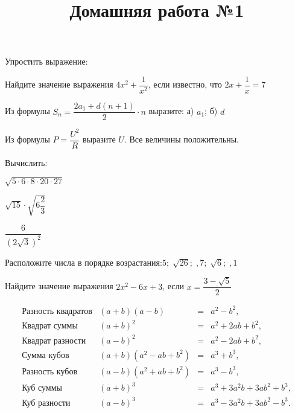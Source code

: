 \begin{listofex}
	\item Упростить выражение:
	\begin{enumcols}[itemcolumns=2]
		\item {}
		\item {}
		\item {}
		\item {}
		\item {}
		\item {}
	\end{enumcols}
	\item {}
	\item {}
	\item Найдите значение выражения \( 4x^2+\dfrac{1}{x^2} \), если известно, что \( 2x+\dfrac{1}{x}=7 \)
	\item Из формулы \( S_n=\dfrac{2a_1+d(n+1)}{2}\cdot n \) выразите: а) \( a_1 \); б) \( d \)
	\item Из формулы \( P=\dfrac{U^2}{R} \) выразите \( U \). Все величины положительны.
	
	\item Вычислить:
	\begin{enumcols}[itemcolumns=3]
		\item \( \sqrt{5\cdot6\cdot8\cdot20\cdot27} \)
		\item \( \sqrt{15}\cdot\sqrt{6\dfrac{2}{3}} \)
		\item \( \dfrac{6}{(2\sqrt{3})^2} \)
	\end{enumcols}
	\item Расположите числа в порядке возрастания:\quad\( 5;\;\sqrt{26};\;,7;\;\sqrt{6};\;,1 \)
	\item Найдите значение выражения \( 2x^2-6x+3 \), если \( x=\dfrac{3-\sqrt{5}}{2} \)
\end{listofex}
\newpage
\title{Домашняя работа №1}
\[ \begin{array}{cccc}
	\text{Разность квадратов}&(a+b)(a-b)& =&a^2-b^2,\\
	\text{Квадрат суммы}&(a+b)^2& =&a^2+2ab+b^2,\\
	\text{Квадрат разности}&(a-b)^2& =&a^2-2ab+b^2,\\
	\text{Сумма кубов}&(a+b)(a^2-ab+b^2)& =&a^3+b^3,\\
	\text{Разность кубов}&(a-b)(a^2+ab+b^2)& =&a^3-b^3,\\
	\text{Куб суммы}&(a+b)^3& =&a^3+3a^2b+3ab^2+b^3,\\
	\text{Куб разности}&(a-b)^3& =&a^3-3a^2b+3ab^2-b^3.\\
\end{array} \]
